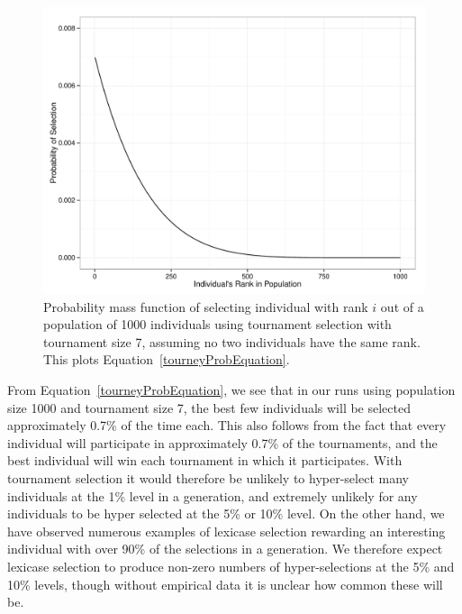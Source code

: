 \documentclass{sig-alternate}
\begin{document}
\begin{figure}[t] %
\centering
\includegraphics[width=\linewidth]{probSelectionTourney7.pdf}
\caption{Probability mass function of selecting individual with rank $i$ out of a population of 1000 individuals using tournament selection with tournament size 7, assuming no two individuals have the same rank. This plots Equation~\ref{tourneyProbEquation}.}
\label{fig:prob-selection-tourney-7}
\end{figure}


From Equation~\ref{tourneyProbEquation}, we see that in our runs using population size 1000 and tournament size 7, the best few individuals will be selected approximately 0.7\% of the time each. This also follows from the fact that every individual will participate in approximately 0.7\% of the tournaments, and the best individual will win each tournament in which it participates.
With tournament selection it would therefore be unlikely to hyper-select many individuals at the 1\% level in a generation, and extremely unlikely for any individuals to be hyper selected at the 5\% or 10\% level.
On the other hand, we have observed numerous examples of lexicase selection rewarding an interesting individual with over 90\% of the selections in a generation. We therefore expect lexicase selection to produce non-zero numbers of hyper-selections at the 5\% and 10\% levels, though without empirical data it is unclear how common these will be.
\end{document}
